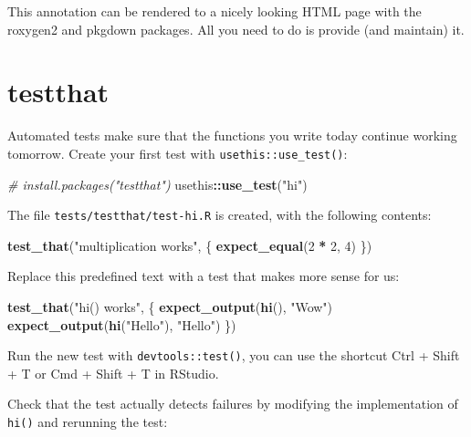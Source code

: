 \documentclass[]{book}
\newenvironment{Shaded}{\begin{snugshade}}{\end{snugshade}}
\newcommand{\CommentTok}[1]{\textcolor[rgb]{0.56,0.35,0.01}{\textit{#1}}}
\newcommand{\DecValTok}[1]{\textcolor[rgb]{0.00,0.00,0.81}{#1}}
\newcommand{\KeywordTok}[1]{\textcolor[rgb]{0.13,0.29,0.53}{\textbf{#1}}}
\newcommand{\NormalTok}[1]{#1}
\newcommand{\OperatorTok}[1]{\textcolor[rgb]{0.81,0.36,0.00}{\textbf{#1}}}
\newcommand{\StringTok}[1]{\textcolor[rgb]{0.31,0.60,0.02}{#1}}
\begin{document}
This annotation can be rendered to a nicely looking HTML page with the roxygen2 and pkgdown packages.
All you need to do is provide (and maintain) it.

\hypertarget{testthat}{%
\section{testthat}\label{testthat}}

Automated tests make sure that the functions you write today continue working tomorrow.
Create your first test with \texttt{usethis::use\_test()}:

\begin{Shaded}
\begin{Highlighting}[]
\CommentTok{# install.packages("testthat")}
\NormalTok{usethis}\OperatorTok{::}\KeywordTok{use_test}\NormalTok{(}\StringTok{"hi"}\NormalTok{)}
\end{Highlighting}
\end{Shaded}

The file \texttt{tests/testthat/test-hi.R} is created, with the following contents:

\begin{Shaded}
\begin{Highlighting}[]
\KeywordTok{test_that}\NormalTok{(}\StringTok{"multiplication works"}\NormalTok{, \{}
  \KeywordTok{expect_equal}\NormalTok{(}\DecValTok{2} \OperatorTok{*}\StringTok{ }\DecValTok{2}\NormalTok{, }\DecValTok{4}\NormalTok{)}
\NormalTok{\})}
\end{Highlighting}
\end{Shaded}

Replace this predefined text with a test that makes more sense for us:

\begin{Shaded}
\begin{Highlighting}[]
\KeywordTok{test_that}\NormalTok{(}\StringTok{"hi() works"}\NormalTok{, \{}
  \KeywordTok{expect_output}\NormalTok{(}\KeywordTok{hi}\NormalTok{(), }\StringTok{"Wow"}\NormalTok{)}
  \KeywordTok{expect_output}\NormalTok{(}\KeywordTok{hi}\NormalTok{(}\StringTok{"Hello"}\NormalTok{), }\StringTok{"Hello"}\NormalTok{)}
\NormalTok{\})}
\end{Highlighting}
\end{Shaded}

Run the new test with \texttt{devtools::test()}, you can use the shortcut Ctrl + Shift + T or Cmd + Shift + T in RStudio.

Check that the test actually detects failures by modifying the implementation of \texttt{hi()} and rerunning the test:
\end{document}
